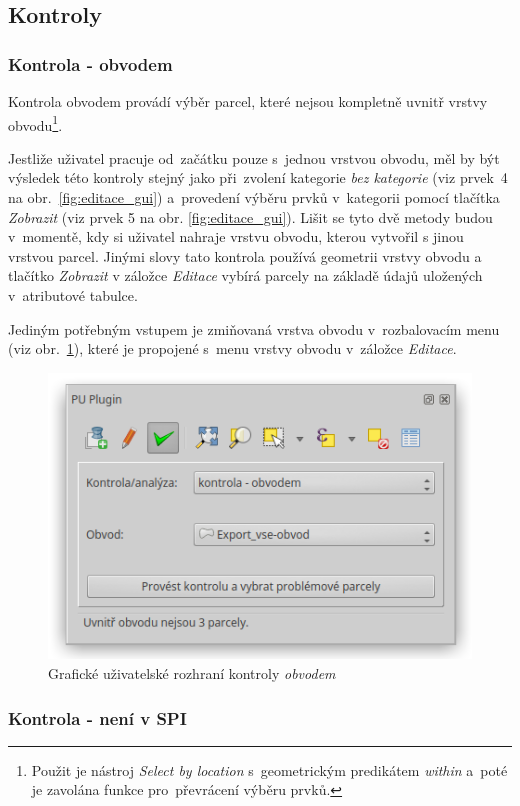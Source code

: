\subsection{Kontroly}
\label{kontroly}

\subsubsection{Kontrola - obvodem}
\label{kontrola_obvodem}

Kontrola obvodem provádí výběr parcel, které nejsou kompletně uvnitř vrstvy obvodu\footnote{Použit je nástroj \textit{Select by location} s~geometrickým predikátem \textit{within} a~poté je zavolána funkce pro~převrácení výběru prvků.}.

Jestliže uživatel pracuje od~začátku pouze s~jednou vrstvou obvodu, měl by být výsledek této kontroly stejný jako při~zvolení kategorie \textit{bez kategorie} (viz prvek~4 na obr.~\ref{fig:editace_gui}) a~provedení výběru prvků v~kategorii pomocí tlačítka \textit{Zobrazit} (viz prvek 5 na obr. \ref{fig:editace_gui}). Lišit se tyto dvě metody budou v~momentě, kdy si uživatel nahraje vrstvu obvodu, kterou vytvořil s jinou vrstvou parcel. Jinými slovy tato kontrola používá geometrii vrstvy obvodu a tlačítko \textit{Zobrazit} v záložce \textit{Editace} vybírá parcely na základě údajů uložených v~atributové tabulce.

Jediným potřebným vstupem je zmiňovaná vrstva obvodu v~rozbalovacím menu (viz obr.~\ref{fig:kontrola_obvodem_gui}), které je propojené s~menu vrstvy obvodu v~záložce \textit{Editace}.

	\begin{figure}[H]
		\centering
		\includegraphics[width=.55\textwidth]{./pictures/kontrola-obvodem.png}
		\caption[Grafické uživatelské rozhraní kontroly \textit{obvodem}]{Grafické uživatelské rozhraní kontroly \textit{obvodem}}
		\label{fig:kontrola_obvodem_gui}
 	\end{figure}

\subsubsection{Kontrola - není v SPI}
\label{kontrola_neni_v_spi}

